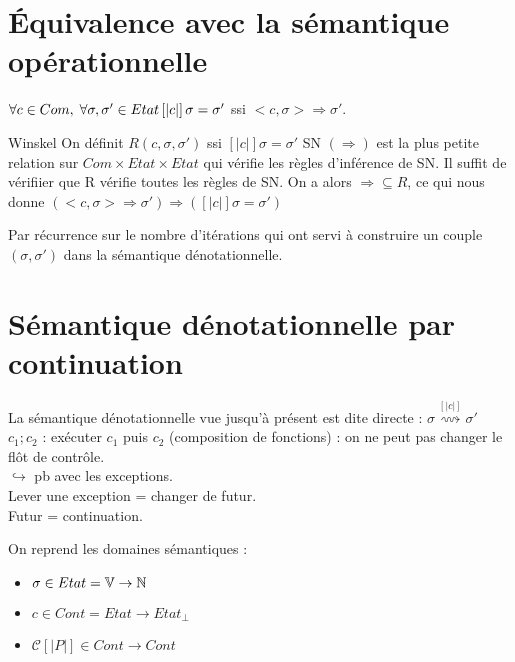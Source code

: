 \documentclass[10pt,a4paper]{article}
\newcommand{\semm}[1]{\left[| #1 | \right]}
\newcommand{\V}{\mathbb{V}}
\begin{document}
\section{Équivalence avec la sémantique opérationnelle}
\begin{thm}{} $\forall c \in Com, \; \forall \sigma, \sigma' \in Etat\\
\semm{c} \sigma = \sigma'$ ssi $<c, \sigma> \Rightarrow \sigma'$.\\
\end{thm}

\begin{dem}{Winskel} \fbox{$\Leftarrow$} On définit $R(c, \sigma, \sigma')$ ssi $\semm{c} \sigma = \sigma'$
SN $(\Rightarrow)$ est la plus petite relation sur $Com \times Etat \times Etat$ qui vérifie les règles d'inférence de SN.
Il suffit de vérifiier que R vérifie toutes les règles de SN.
On a alors $\Rightarrow \subseteq R$, ce qui nous donne $(<c, \sigma> \Rightarrow \sigma') \Longrightarrow (\semm{c} \sigma = \sigma')$


\fbox{$\Rightarrow$} Par récurrence sur le nombre d'itérations qui ont servi à construire un couple $(\sigma, \sigma')$ dans la sémantique dénotationnelle.\\
\end{dem}


\section{Sémantique dénotationnelle par continuation}

La sémantique dénotationnelle vue jusqu'à présent est dite directe : $ \sigma \stackrel{\semm{c}}{\rightsquigarrow} \sigma'$\\
$c_1;c_2$ : exécuter $c_1$ puis $c_2$ (composition de fonctions) : on ne peut pas changer le flôt de contrôle.\\
$\hookrightarrow $ pb avec les exceptions.\\
Lever une exception = changer de futur.\\
Futur = continuation.

On reprend les domaines sémantiques : 
\begin{itemize}
 \item $\sigma \in Etat = \V \to \N$
 \item $c \in Cont = Etat \to Etat_{\perp}$
 \item $\mathcal{C} \semm{P} \in Cont \to Cont$
\end{itemize}
\end{document}
